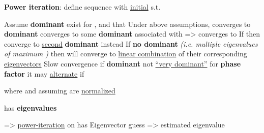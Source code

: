 \textbf{Power iteration}: define sequence
with \underline{initial}  s.t. 
\begin{itemize}
      \vItem
            Assume \textbf{dominant}  exist
            for , and that
      \vItem
            Under above assumptions,
            converges to \textbf{dominant }
      \vItem
             converges to some
            \textbf{dominant}  associated with
             =>
             converges to
      \vItem
            If 
            then 
            converge to \underline{second} \textbf{dominant}  instead
      \vItem
            If \textbf{no dominant \iMbox{\lambda}} \emph{(i.e. multiple
                  eigenvalues of maximum \iMbox{|\lambda|})} then
             will converge to \underline{linear combination}
            of their corresponding \underline{eigenvectors}
      \vItem
            Slow convergence if \textbf{dominant } not \underline{``very dominant''}
      \vItem
            for \textbf{phase factor}  it may \underline{alternate} if 
            \begin{itemize}

                  \vItem
                        where  and assuming
                         are \underline{normalized}
            \end{itemize}
      \vItem
             has \textbf{eigenvalues} \iMbox{\lambda-\sigma}

            => \underline{power-iteration} on  has 
      \vItem
            Eigenvector guess => estimated eigenvalue
\end{itemize}

